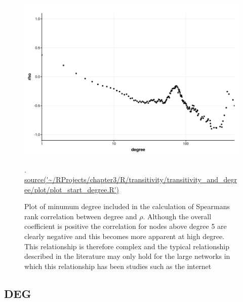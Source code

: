\begin{figure}
    \centering
    \includegraphics[width=\textwidth]{images/chapter3/ggplot2/degree_and_transitivity/Rplot_rho_and_starting_degree_transitivity.png}
    \caption{Plot of minumum degree included in the calculation of Spearmans rank correlation between degree and $\rho$. Although the overall coefficient is positive the correlation for nodes above degree 5 are clearly negative and this becomes more apparent at high degree. This relationship is therefore complex and the typical relationship described in the literature may only hold for the large networks in which this relationship has been studies such as the internet}.
    \tiny\url{source('~/RProjects/chapter3/R/transitivity/transitivity_and_degree/plot/plot_start_degree.R')}
    \label{fig:Plot of minumum degree included in the calculation of Spearmans rank correlation between degree and rho}
\end{figure}



\subsection{DEG}

